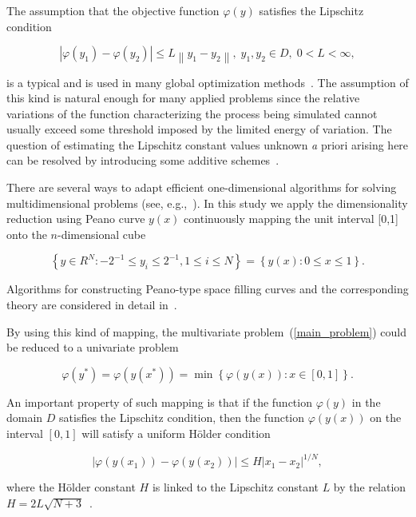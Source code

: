 \documentclass[mathematics,article,accept,pdftex,moreauthors]{Definitions/mdpi}
\begin{document}
The assumption that the objective function $\varphi(y)$ satisfies the Lipschitz condition
\begin{linenomath}
\begin{equation}
\left|\varphi(y_1)-\varphi(y_2)\right|\leq L\left\|y_1-y_2\right\|,\; y_1,y_2 \in D, \; 0<L<\infty,
\end{equation}
\end{linenomath}
is a typical and is used in many global optimization methods~\cite{Sergeyev2013,Evtushenko2013,Jones2009,Zilinskas2010}.
The assumption of this kind is natural enough for many applied problems since the relative variations of the function characterizing the process being simulated cannot usually exceed some threshold imposed by the limited energy of variation. The question of estimating the Lipschitz constant values unknown {\textit a priori} arising here can be resolved by introducing some additive schemes~\cite{Strongin2020,Strongin2020_1}.

There are several ways to adapt efficient one-dimensional algorithms for solving multidimensional problems (see, e.g.,~\cite{Sergeyev2017,Zilinskas2014}). In this study we apply the dimensionality reduction using Peano curve $y(x)$ continuously mapping the unit interval [0,1] onto the $n$-dimensional cube
\begin{linenomath}
\begin{equation}
\left\{y\in R^N: -2^{-1}\leq y_i \leq 2^{-1}, 1 \leq i \leq N\right\}=\left\{y(x):0\leq x \leq 1 \right\}.
\end{equation}
\end{linenomath}

Algorithms for constructing Peano-type space filling curves and the corresponding theory are considered in detail in~\cite{Strongin2000,Sergeyev2013}.

By using this kind of mapping, the multivariate problem~(\ref{main_problem}) could be reduced to a univariate problem
\begin{linenomath}
\begin{equation}
\varphi(y^\ast)=\varphi(y(x^\ast))=\min{\left\{\varphi(y(x)): x\in[0,1]\right\}}.
\end{equation}
\end{linenomath}

An important property of such mapping is that if the function $\varphi(y)$ in the domain $D$ satisfies the Lipschitz condition, then the function $\varphi(y(x))$ on the interval $[0,1]$ will satisfy a uniform H{\"o}lder condition
\begin{linenomath}
\begin{equation}
\left|\varphi(y(x_1))-\varphi(y(x_2))\right|\leq H\left|x_1-x_2\right|^{1/N},
\end{equation}
\end{linenomath}
where the H{\"o}lder constant $H$ is linked to the Lipschitz constant $L$ by the relation $H=2L\sqrt{N+3}$~\cite{Strongin2000}.
\end{document}
